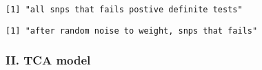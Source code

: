 \documentclass[11pt]{article}
\begin{document}
    \begin{Verbatim}[commandchars=\\\{\}]
[1] "all snps that fails postive definite tests"

    \end{Verbatim}

    

    
    

    
    \begin{Verbatim}[commandchars=\\\{\}]
[1] "after random noise to weight, snps that fails"

    \end{Verbatim}

    

    
    

    
    \subsubsection{II. TCA model}\label{ii.-tca-model}
\end{document}
